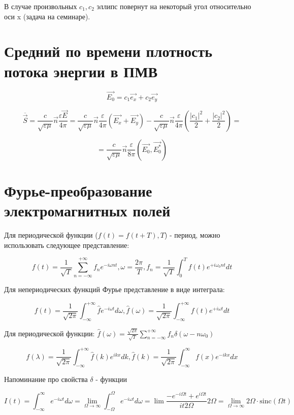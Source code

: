 \documentclass[12pt, a4paper]{report}
\begin{document}


В случае произвольных  \( c_1, c_2 \)  эллипс повернут на некоторый угол относительно оси x (задача на семинаре).

\section{Средний по времени плотность  потока энергии в ПМВ}

\[ \vec{E_0}= c_1\vec{e_x}+ c_2 \vec{e_y} \] 

\[ \overline{\vec{S}} = \frac{c}{\sqrt{\varepsilon \mu}} \vec{n} \frac{\varepsilon\vec{E}}{4 \pi} = \frac{c}{\sqrt{\varepsilon \mu}} \vec{n} \frac{\varepsilon}{4 \pi} (\vec{E_x}+ \vec{E_y} )-\frac{c}{\sqrt{\varepsilon \mu}}\vec{n} \frac{\varepsilon}{4 \pi}( \frac{|c_1| ^2}{2}+ \frac{|c_2| ^2}{2} )  =  \] 

\[ = \frac{c}{\sqrt{\varepsilon \mu}} \vec{n} \frac{\varepsilon}{8 \pi} ( \vec{E_0}, \vec{E_0^*} )  \] 

\section{Фурье-преобразование электромагнитных полей}

Для периодической функции (\( f(t)= f(t+T) ,T\)) - период, можно использовать следующее представление: 

\[ f(t)= \frac{1}{\sqrt{T}} \sum_{n=- \infty }^{+ \infty }f_n e^{- i \omega nt } , \omega = \frac{2 \pi}{T}, f_n = \frac{1}{\sqrt{T}}  \int_{0}^{T}f(t)e^{+i \omega_0 nt} dt      \] 


Для непериодических функций Фурье представление в виде интеграла: 

\[ f(t)= \frac{1}{\sqrt{2 \pi}} \int_{-\infty }^{+\infty} \hat{f}e^{-i \omega t}d \omega, \hat{f}( \omega)= \frac{1}{\sqrt{2 \pi}} \int_{-\infty }^{+\infty}    f(t) e^{+i \omega t}dt     \] 

Для периодической функции: \( \hat{f}( \omega)= \frac{\sqrt{2\pi}}{\sqrt{T}} \sum ^{+\infty }_{n = - \infty } f_n \delta( \omega- n \omega_0)     \) 

\[ f(\lambda)= \frac{1}{\sqrt{2 \pi}}\int _{-\infty }^{+\infty} \hat{f}(k)e^{i k x }d k  , \hat{f}(k)= \frac{1}{\sqrt{2 \pi}} \int_{-\infty}^{\infty} f(x)e^{- ikx} dx    \] 

Напоминание про свойства \( \delta \) - функции

\[ I(t)= \int_{-\infty}^{\infty} e^{- i \omega t} d \omega = \lim_{\Omega \to \infty} \int_{-\Omega}^{\Omega}e^{- i \omega t} d \omega  = \lim \frac{-e^{-i \Omega t} + e^{i \Omega t}}{it 2 \Omega}  2 \Omega = \lim_{\Omega \to \infty}   2 \Omega  \cdot\mathrm{sinc}(\Omega t)    \] 
\end{document}
